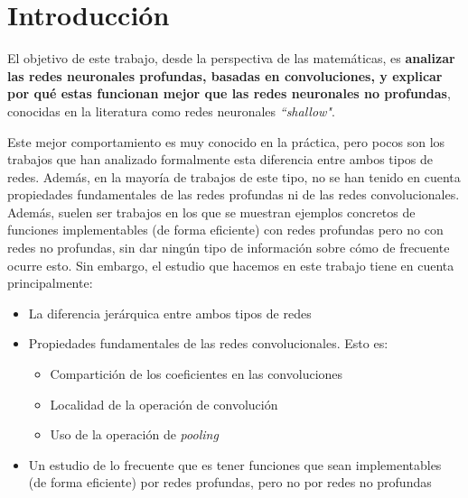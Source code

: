 
\chapter{Introducción}\label{ch:introduccion}

El objetivo de este trabajo, desde la perspectiva de las matemáticas, es \textbf{analizar las redes neuronales profundas, basadas en convoluciones, y explicar por qué estas funcionan mejor que las redes neuronales no profundas}, conocidas en la literatura como redes neuronales \textit{``shallow"}.

%
Este mejor comportamiento es muy conocido en la práctica, pero pocos son los trabajos que han analizado formalmente esta diferencia entre ambos tipos de redes. Además, en la mayoría de trabajos de este tipo, no se han tenido en cuenta propiedades fundamentales de las redes profundas ni de las redes convolucionales. Además, suelen ser trabajos en los que se muestran ejemplos concretos de funciones implementables (de forma eficiente) con redes profundas pero no con redes no profundas, sin dar ningún tipo de información sobre cómo de frecuente ocurre esto. Sin embargo, el estudio que hacemos en este trabajo tiene en cuenta principalmente:

\begin{itemize}
    \item La diferencia jerárquica entre ambos tipos de redes
    \item Propiedades fundamentales de las redes convolucionales. Esto es:
        \begin{itemize}
            \item Compartición de los coeficientes en las convoluciones
            \item Localidad de la operación de convolución
            \item Uso de la operación de \textit{pooling}
        \end{itemize}
    \item Un estudio de lo frecuente que es tener funciones que sean implementables (de forma eficiente) por redes profundas, pero no por redes no profundas
\end{itemize}


